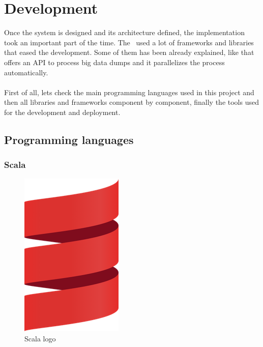 
\chapter{Development}

\label{chapter07}

Once the system is designed and its architecture defined, the implementation took an important part of the time. The \thesis\ used a lot of frameworks and libraries that eased the development. Some of them has been already explained, like  that offers an API to process big data dumps and it parallelizes the process automatically.
\\\\
First of all, lets check the main programming languages used in this project and then all libraries and frameworks component by component, finally the tools used for the development and deployment.

\section{Programming languages}

\subsection*{Scala\cite{scala}} \label{scala}

\begin{figure}[H]
\centering
\includegraphics[scale=0.1]{resources/scala-logo.png}
\caption{Scala logo}
\end{figure}

